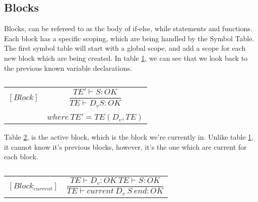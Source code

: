 \subsection{Blocks}
Blocks, can be refereed to as the body of if-else, while statements and functions. Each block has a specific scoping, which are being handled by the Symbol Table. The first symbol table will start with a global scope, and add a scope for each new block which are being created. In table \ref{block}, we can see that we look back to the previous known variable declarations. 
\begin{table}[H]
    \begin{center}
    \begin{longtable}[c] { r c }
        $[Block]$ 
        & 
        \( \dfrac{TE' \vdash S : OK} 
        {TE \vdash D_v S : OK} \) 
        \\ \\
        & 
        \( {where \ TE' = TE(D_v, TE)} \)
    \end{longtable}
    \caption{}\label{block}
        \end{center}
\end{table}

Table \ref{active-block}, is the active block, which is the block we're currently in. Unlike table \ref{block}, it cannot know it's previous blocks, however, it's the one which are current for each block.
\begin{table}[H]
    \begin{center}
    \begin{longtable}[c] { r c }
        $[Block_{current}]$ 
        & 
        \( \dfrac{TE \vdash D_{v} : OK \ TE \vdash S : OK} 
        {TE \vdash current \ D_{v} \ S \ end  :  OK} \)
    \end{longtable}
    \caption{}\label{active-block}
        \end{center}
\end{table}
